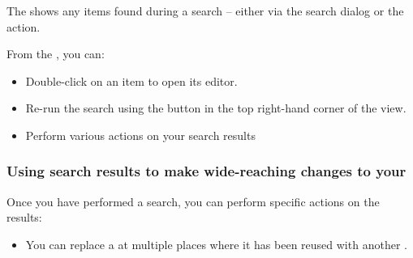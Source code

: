 The \gdsearchresultview{} shows any items found during a search -- either via the search dialog or the  action.

From the \gdsearchresultview{}, you can:

\begin{itemize}
\item Double-click on an item to open its editor. 
\item Re-run the search using the button in the top right-hand corner of the view. 
\item Perform various actions on your search results 
\end{itemize}

\subsubsection{Using search results to make wide-reaching changes to your \gdproject{}}
\label{TasksSearchResultActions}

Once you have performed a search, you can perform specific actions on the results:
\begin{itemize}
\item You can replace a \gdcase{} at multiple places where it has been reused with another \gdcase{} .
\end{itemize}

